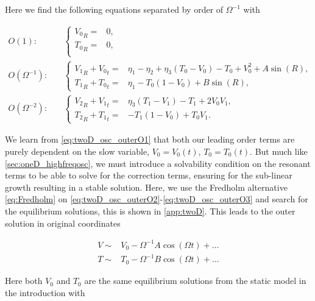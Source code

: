 Here we find the following equations separated by order of $\Omega^{-1}$ with

\begin{align}
\label{eq:twoD_osc_outerO1}
O(1):\quad & \begin{cases}
	{V_0}_R =& 0, \\
	{T_0}_R =& 0,\\
\end{cases}\\
\label{eq:twoD_osc_outerO2}
O(\Omega^{-1}):\quad & \begin{cases}
	{V_1}_R+{V_0}_t = & \eta_1-\eta_2+\eta_3(T_0-V_0)-T_0+V_0^2+A\sin(R),\\
	 {T_1}_R +{T_0}_t =& \eta_1-T_0(1-V_0)+B\sin(R),
\end{cases}\\
\label{eq:twoD_osc_outerO3}
O(\Omega^{-2}):\quad & \begin{cases}
	{V_2}_R+{V_1}_t = & \eta_3(T_1-V_1)-T_1+2V_0V_1,\\
	 {T_2}_R +{T_1}_t =& -T_1(1-V_0)+T_0V_1.
\end{cases}
\end{align}

We learn from \eqref{eq:twoD_osc_outerO1} that both our leading order terms are purely dependent on the slow variable, $V_0=V_0(t)$, $T_0=T_0(t)$. But much like \autoref{sec:oneD_highfreqosc}, we must introduce a solvability condition on the resonant terms to be able to solve for the correction terms, ensuring for the sub-linear growth resulting in a stable solution. Here, we use the Fredholm alternative \eqref{eq:Fredholm} on \eqref{eq:twoD_osc_outerO2}-\eqref{eq:twoD_osc_outerO3} and search for the equilibrium solutions, this is shown in \autoref{app:twoD}. This leads to the outer solution in original coordinates

\begin{equation}\label{eq:twoD_osc_outersoln}
\begin{aligned}
V\sim& V_0-\Omega^{-1} A\cos(\Omega t)+\dots\\
T\sim& T_0-\Omega^{-1} B\cos(\Omega t)+\ldots%
\end{aligned}
\end{equation}

Here both $V_0$ and $T_0$ are the same equilibrium solutions from the static model in the introduction with


